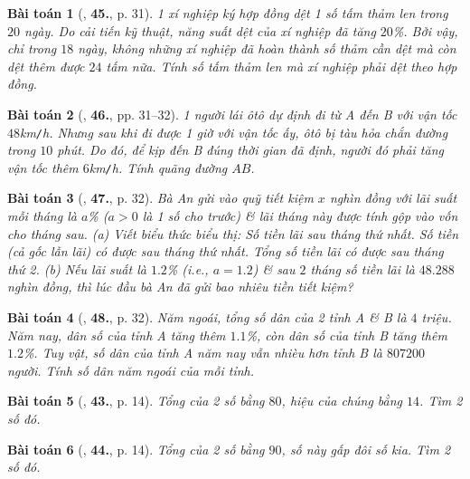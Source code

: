 \documentclass{article}
\numberwithin{equation}{section}
\newtheorem{baitoan}{Bài toán}
\begin{document}
\begin{baitoan}[\cite{SGK_Toan_8_tap_2}, \textbf{45.}, p. 31]
	1 xí nghiệp ký hợp đồng dệt 1 số tấm thảm len trong $20$ ngày. Do cải tiến kỹ thuật, năng suất dệt của xí nghiệp đã tăng $20$\%. Bởi vậy, chỉ trong $18$ ngày, không những xí nghiệp đã hoàn thành số thảm cần dệt mà còn dệt thêm được $24$ tấm nữa. Tính số tấm thảm len mà xí nghiệp phải dệt theo hợp đồng.
\end{baitoan}

\begin{baitoan}[\cite{SGK_Toan_8_tap_2}, \textbf{46.}, pp. 31--32]
	1 người lái ôtô dự định đi từ A đến B với vận tốc $48$\emph{km\texttt{/}h}. Nhưng sau khi đi được 1 giờ với vận tốc ấy, ôtô bị tàu hỏa chắn đường trong $10$ phút. Do đó, để kịp đến B đúng thời gian đã định, người đó phải tăng vận tốc thêm $6$\emph{km\texttt{/}h}. Tính quãng đường $AB$.
\end{baitoan}

\begin{baitoan}[\cite{SGK_Toan_8_tap_2}, \textbf{47.}, p. 32]
	Bà An gửi vào quỹ tiết kiệm $x$ nghìn đồng với lãi suất mỗi tháng là $a$\% ($a > 0$ là 1 số cho trước) \& lãi tháng này được tính gộp vào vốn cho tháng sau. (a) Viết biểu thức biểu thị: Số tiền lãi sau tháng thứ nhất. Số tiền (cả gốc lẫn lãi) có được sau tháng thứ nhất. Tổng số tiền lãi có được sau tháng thứ 2. (b) Nếu lãi suất là $1.2$\% (i.e., $a = 1.2$) \& sau $2$ tháng số tiền lãi là $48.288$ nghìn đồng, thì lúc đầu bà An đã gửi bao nhiêu tiền tiết kiệm?
\end{baitoan}

\begin{baitoan}[\cite{SGK_Toan_8_tap_2}, \textbf{48.}, p. 32]
	Năm ngoái, tổng số dân của 2 tỉnh A \& B là $4$ triệu. Năm nay, dân số của tỉnh A tăng thêm $1.1$\%, còn dân số của tỉnh B tăng thêm $1.2$\%. Tuy vật, số dân của tỉnh A năm nay vẫn nhièu hơn tỉnh B là $807200$ người. Tính số dân năm ngoái của mỗi tỉnh.
\end{baitoan}

\begin{baitoan}[\cite{SBT_Toan_8_tap_2}, \textbf{43.}, p. 14]
	Tổng của 2 số bằng $80$, hiệu của chúng bằng $14$. Tìm 2 số đó.	
\end{baitoan}

\begin{baitoan}[\cite{SBT_Toan_8_tap_2}, \textbf{44.}, p. 14]
	Tổng của 2 số bằng $90$, số này gấp đôi số kia. Tìm 2 số đó.
\end{baitoan}
\end{document}
